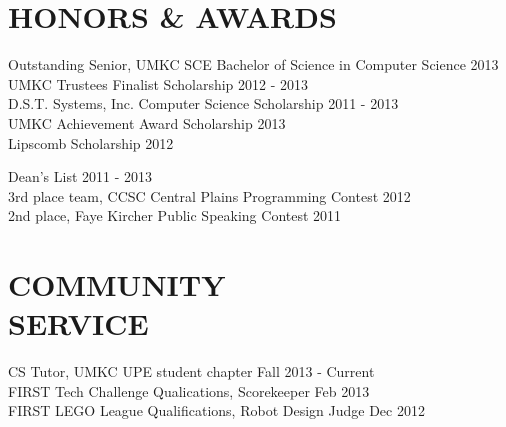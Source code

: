 \documentclass[line,margin]{res}
\begin{document}
\begin{resume}
\section{HONORS \& AWARDS}
		Outstanding Senior, UMKC SCE Bachelor of Science in Computer Science \hfill 2013 \\
		UMKC Trustees Finalist Scholarship \hfill 2012 - 2013 \\
		D.S.T. Systems, Inc. Computer Science Scholarship \hfill 2011 - 2013 \\ 
		UMKC Achievement Award Scholarship \hfill 2013 \\
		Lipscomb Scholarship \hfill 2012 

		Dean's List \hfill 2011 - 2013 \\
		3rd place team, CCSC Central Plains Programming Contest \hfill 2012 \\
		2nd place, Faye Kircher Public Speaking Contest \hfill 2011
	
\section{COMMUNITY \\ SERVICE}  
            	CS Tutor, UMKC UPE student chapter  \hfill Fall 2013 - Current \\
                FIRST Tech Challenge Qualications, Scorekeeper \hfill Feb 2013 \\
		FIRST LEGO League Qualifications, Robot Design Judge \hfill Dec 2012 
\end{resume}
\end{document}
